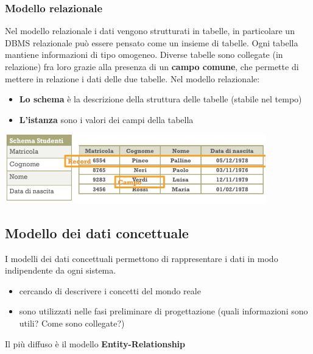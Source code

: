 \documentclass[12pt]{article}
\begin{document}
\subsubsection{Modello relazionale}
Nel modello relazionale i dati vengono strutturati in tabelle, in particolare un DBMS relazionale può essere pensato come un insieme di tabelle.
Ogni tabella mantiene informazioni di tipo omogeneo. Diverse tabelle sono collegate (in relazione) fra loro grazie alla presenza di un \textbf{campo comune}, che permette di mettere in relazione i dati delle due tabelle.
Nel modello relazionale:
\begin{itemize}
    \item \textbf{Lo schema} è la descrizione della struttura delle tabelle (stabile nel tempo)
    \item \textbf{L'istanza} sono i valori dei campi della tabella
\end{itemize}
\begin{center}
    \includegraphics[width = 0.85\textwidth]{Images/6.PNG}
\end{center}
\subsection{Modello dei dati concettuale}
I modelli dei dati concettuali permettono di rappresentare i dati in modo indipendente da ogni sistema.
\begin{itemize}
    \item cercando di descrivere i concetti del mondo reale
    \item sono utilizzati nelle fasi preliminare di progettazione (quali informazioni sono utili? Come sono collegate?)
\end{itemize}
Il più diffuso è il modello \textbf{Entity-Relationship}
\newpage
\end{document}
